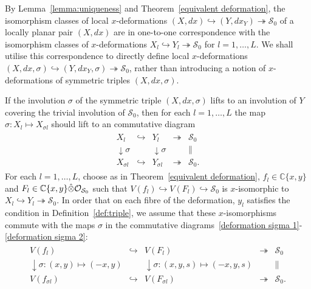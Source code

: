 \documentclass[11pt,twoside]{amsart}
\theoremstyle{plain}
\newcommand{\Sm}{\mathcal{S}}
\newcommand{\Sh}[1]{\mathcal{#1}} %
\newcommand{\dfx}{dx}
\begin{document}
 By Lemma~\ref{lemma:uniqueness} and Theorem~\ref{equivalent deformation}, the isomorphism classes of local $x$-deformations $(X,dx)\hookrightarrow (Y,dx_Y) \twoheadrightarrow\Sm_0$ of a locally planar pair $(X,\dfx)$ are in one-to-one correspondence with the isomorphism classes of $x$-deformations $X_l\hookrightarrow Y_l\twoheadrightarrow\Sm_0$ for $l=1,\ldots,L$. We shall utilise this correspondence to directly define local $x$-deformations $ (X,\dfx, \sigma)\hookrightarrow (Y,\dfx_Y, \sigma)\twoheadrightarrow\Sm_0$, rather than introducing a notion of  $ x$-deformations of symmetric triples $(X,\dfx,\sigma)$. 

If the involution $\sigma$ of the symmetric triple $(X,\dfx,\sigma)$ lifts to an involution of $Y$ covering the trivial involution of $\Sm_0$, then for each $l=1,\ldots,L$ the map $\sigma:X_l\mapsto X_{\sigma l}$ should lift to an commutative diagram
\begin{gather}\label{deformation sigma 1}\begin{array}{lclcl}
X_l&\hookrightarrow&Y_l&\twoheadrightarrow&\Sm_0\\
\downarrow\sigma&&\downarrow\sigma&&\|\\
X_{\sigma l}&\hookrightarrow&Y_{\sigma l}&\twoheadrightarrow&\Sm_0.
\end{array}\end{gather}
For each $l=1,\ldots,L$, choose as in Theorem~\ref{equivalent deformation}, $f_l\in\mathbb{C}\{x,y\}$ and $F_l\in\mathbb{C}\{x,y\}\Hat{\otimes}\Sh{O}_{\Sm_0}$ such that $V(f_l)\hookrightarrow V(F_l)\hookrightarrow\Sm_0$ is $x$-isomorphic to $X_l\hookrightarrow Y_l\twoheadrightarrow\Sm_0$. In order that on each fibre of the deformation, $y_l$ satisfies the condition in Definition~\ref{def:triple},  we assume that these $x$-isomorphisms commute with the maps $\sigma$ in the commutative diagrams~\eqref{deformation sigma 1}-\eqref{deformation sigma 2}:
\begin{gather}\label{deformation sigma 2}\begin{array}{lclcl}
V(f_l)&\hookrightarrow&V(F_l)&\twoheadrightarrow&\Sm_0\\
\downarrow\sigma:(x,y)\mapsto(-x,y)&&\downarrow\sigma:(x,y,s)\mapsto(-x,y,s)&&\|\\
V(f_{\sigma l})&\hookrightarrow&V(F_{\sigma l})&\twoheadrightarrow&\Sm_0.
\end{array}\end{gather}
\end{document}
